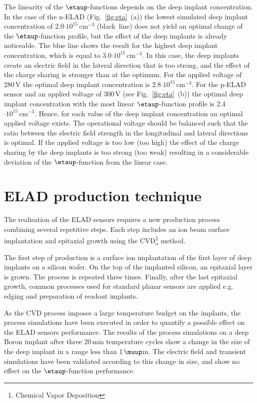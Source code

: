 \documentclass[a4paper,11pt]{article}
\begin{document}
The linearity of the $\etaup$-functions depends on the deep implant concentration.
In the case of the n-ELAD (Fig.~\ref{fig:eta}~(a)) the lowest simulated deep implant concentration of 2.0$\mathrm{\cdot10^{15}\,cm^{-3}}$ (black~line) does not yield an optimal change of the $\etaup$-function profile, but the effect of the deep implants is already noticeable. 
The blue line shows the result for the highest deep implant concentration, which is equal to 3.0$\mathrm{\cdot10^{15}\,cm^{-3}}$. 
In this case, the deep implants create an electric field in the lateral direction that is too strong, and the effect of the charge sharing is stronger than at the optimum.
For the applied voltage of 280\,V the optimal deep implant concentration is 2.8$\mathrm{\cdot10^{15}\,cm^{-3}}$.
For the p-ELAD sensor and an applied voltage of 300\,V (see Fig.~\ref{fig:eta}~(b)) the optimal deep implant concentration with the most linear $\etaup$-function profile is 2.4$\mathrm{\cdot10^{15}\,cm^{-3}}$.
Hence, for each value of the deep implant concentration an optimal applied voltage exists. 
The operational voltage should be balanced such that the ratio between the electric field strength in the longitudinal and lateral directions is optimal. 
If the applied voltage is too low (too high) the effect of the charge sharing by the deep implants is too strong (too weak) resulting in a considerable deviation of the $\etaup$-function from the linear case.

\section{ELAD production technique}
\label{sec:pr}
The realisation of the ELAD sensors requires a new production process combining several repetitive steps.
Each step includes an ion beam surface implantation and epitaxial growth using the CVD\footnote{Chemical Vapor Deposition} method. 

The first step of production is a surface ion implantation of the first layer of deep implants on a silicon wafer.
On the top of the implanted silicon, an epitaxial layer is grown.
The process is repeated three times. 
Finally, after the last epitaxial growth, common processes used for standard planar sensors are applied e.g. edging and preparation of readout implants.

As the CVD process imposes a large temperature budget on the implants, the process simulations have been executed in order to quantify a possible effect on the ELAD sensors performance. 
The results of the process simulations on a deep Boron implant after three 20\,min temperature cycles show a change in the size of the deep implant in a range less than 1\,$\muup$m.
The electric field and transient simulations have been validated according to this change in size, and show no effect on the $\etaup$-function performance.
\end{document}
